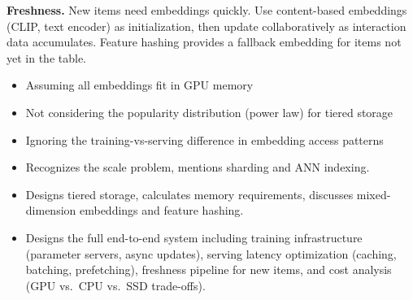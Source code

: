 \begin{interviewq}
\textbf{Freshness.} New items need embeddings quickly. Use content-based embeddings (CLIP, text encoder) as initialization, then update collaboratively as interaction data accumulates. Feature hashing provides a fallback embedding for items not yet in the table.

\redflags
\begin{itemize}
    \item Assuming all embeddings fit in GPU memory
    \item Not considering the popularity distribution (power law) for tiered storage
    \item Ignoring the training-vs-serving difference in embedding access patterns
\end{itemize}


\goodgreat
\begin{itemize}
    \item {} Recognizes the scale problem, mentions sharding and ANN indexing.
    \item {} Designs tiered storage, calculates memory requirements, discusses mixed-dimension embeddings and feature hashing.
    \item {} Designs the full end-to-end system including training infrastructure (parameter servers, async updates), serving latency optimization (caching, batching, prefetching), freshness pipeline for new items, and cost analysis (GPU vs.\ CPU vs.\ SSD trade-offs).
\end{itemize}

\end{interviewq}


